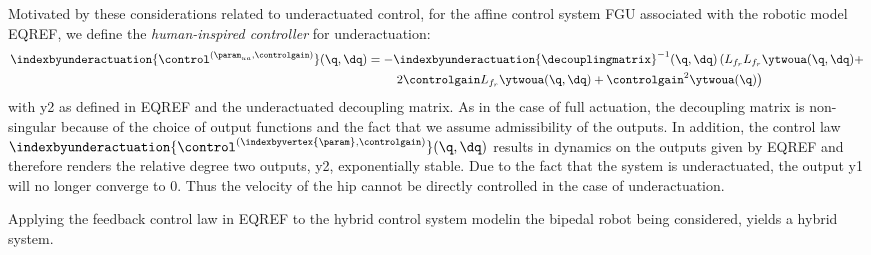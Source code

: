 Motivated by these considerations related to underactuated control, for the affine control system FGU associated with the robotic model EQREF, we define the \textit{human-inspired controller} for underactuation:
\begin{align}
 \indexbyunderactuation{\control^{(\param_{ua},\controlgain)}}(\q,\dq) = -&\indexbyunderactuation{\decouplingmatrix}^{-1}(\q,\dq) \left( L_{f_r}L_{f_r}\ytwoua(\q,\dq) + \right. \\
 & \left. 2 \controlgain L_{f_r}\ytwoua(\q,\dq) + \controlgain^2 \ytwoua(\q)\right)
\end{align}
with y2 as defined in EQREF and the underactuated decoupling matrix. As in the case of full actuation, the decoupling matrix is non-singular because of the choice of output functions and the fact that we assume admissibility of the outputs. In addition, the control law $\indexbyunderactuation{\control^{(\indexbyvertex{\param},\controlgain)}}(\q,\dq)$ results in dynamics on the outputs given by EQREF and therefore renders the relative degree two outputs, y2, exponentially stable. Due to the fact that the system is underactuated, the output y1 will no longer converge to 0. Thus the velocity of the hip cannot be directly controlled in the case of underactuation.

Applying the feedback control law in EQREF to the hybrid control system modelin the bipedal robot being considered, yields a hybrid system.








